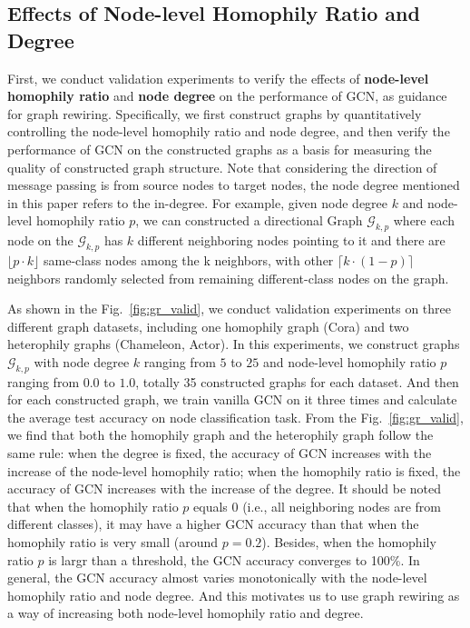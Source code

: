 \documentclass[sigconf]{acmart}
\begin{document}
    \subsection{Effects of Node-level Homophily Ratio and Degree}
	\label{subsec:finding_hr_deg}
	 First, we conduct validation experiments to verify the effects of \textbf{node-level homophily ratio} \cite{pei2020geom, du2021gbk} and \textbf{node degree} on the performance of GCN, as guidance for graph rewiring. Specifically, we first construct graphs by quantitatively controlling the node-level homophily ratio and node degree, and then verify the performance of GCN on the constructed graphs as a basis for measuring the quality of constructed graph structure. Note that considering the direction of message passing is from source nodes to target nodes, the node degree mentioned in this paper refers to the in-degree. For example, given node degree $k$ and node-level homophily ratio $p$, we can constructed a directional Graph $\mathcal{G}_{k,p}$ where each node on the $\mathcal{G}_{k,p}$ has $k$ different neighboring nodes pointing to it and there are $\lfloor p \cdot k\rfloor$ same-class nodes among the k neighbors, with other $\lceil k\cdot (1-p)\rceil$ neighbors randomly selected from remaining different-class nodes on the graph.
	
	
	
	
	
	
	As shown in the Fig.~\ref{fig:gr_valid}, we conduct validation experiments on three different graph datasets, including one homophily graph (Cora) and two heterophily graphs (Chameleon, Actor). In this experiments, we construct graphs $\mathcal{G}_{k, p}$ with node degree $k$ ranging from $5$ to $25$ and node-level homophily ratio $p$ ranging from $0.0$ to $1.0$, totally 35 constructed graphs for each dataset. And then for each constructed graph, we train vanilla GCN \cite{GCN} on it three times and calculate the average test accuracy on node classification task. From the Fig.~\ref{fig:gr_valid}, we find that both the homophily graph and the heterophily graph follow the same rule: when the degree is fixed, the accuracy of GCN increases with the increase of the node-level homophily ratio; when the homophily ratio is fixed, the accuracy of GCN increases with the increase of the degree. It should be noted that when the homophily ratio $p$ equals 0 (i.e., all neighboring nodes are from different classes), it may have a higher GCN accuracy than that when the homophily ratio is very small (around $p=0.2$).  Besides, when the homophily ratio $p$ is largr than a threshold, the GCN accuracy converges to 100\%. In general, the GCN accuracy almost varies monotonically with the node-level homophily ratio and node degree. And this motivates us to use graph rewiring as a way of increasing both node-level homophily ratio and degree.
	
\end{document}
